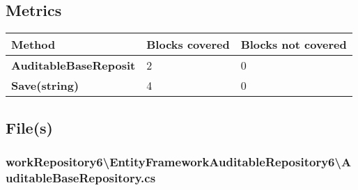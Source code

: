 \documentclass[a4paper,10pt]{article}
\begin{document}
\subsection{Metrics}
\begin{longtable}[l]{|l|l|l|}
\hline
\textbf{Method} & \textbf{Blocks covered} & \textbf{Blocks not covered}\\
\hline
\textbf{AuditableBaseReposit} & 2 & 0\\
\hline
\textbf{Save(string)} & 4 & 0\\
\hline
\end{longtable}
\subsection{File(s)}
\subsubsection{workRepository6\textbackslash EntityFrameworkAuditableRepository6\textbackslash AuditableBaseRepository.cs}
\end{document}
